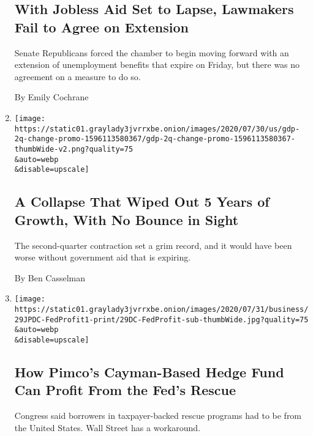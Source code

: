 \begin{enumerate}
{  \subsection{With Jobless Aid Set to Lapse, Lawmakers Fail to Agree on
  Extension}\label{with-jobless-aid-set-to-lapse-lawmakers-fail-to-agree-on-extension}}

  Senate Republicans forced the chamber to begin moving forward with an
  extension of unemployment benefits that expire on Friday, but there
  was no agreement on a measure to do so.

  By Emily Cochrane
\item
  \href{/2020/07/30/business/economy/q2-gdp-coronavirus-economy.html}{}

  \texttt{[image: https://static01.graylady3jvrrxbe.onion/images/2020/07/30/us/gdp-2q-change-promo-1596113580367/gdp-2q-change-promo-1596113580367-thumbWide-v2.png?quality=75\\\&auto=webp\\\&disable=upscale]}

  \hypertarget{a-collapse-that-wiped-out-5-years-of-growth-with-no-bounce-in-sight}{%
  \subsection{A Collapse That Wiped Out 5 Years of Growth, With No
  Bounce in
  Sight}\label{a-collapse-that-wiped-out-5-years-of-growth-with-no-bounce-in-sight}}

  The second-quarter contraction set a grim record, and it would have
  been worse without government aid that is expiring.

  By Ben Casselman
\item
  \href{/2020/07/30/business/economy/fed-talf-wall-street.html}{}

  \texttt{[image: https://static01.graylady3jvrrxbe.onion/images/2020/07/31/business/29JPDC-FedProfit1-print/29DC-FedProfit-sub-thumbWide.jpg?quality=75\\\&auto=webp\\\&disable=upscale]}

  \hypertarget{how-pimcos-cayman-based-hedge-fund-can-profit-from-the-feds-rescue}{%
  \subsection{How Pimco's Cayman-Based Hedge Fund Can Profit From the
  Fed's
  Rescue}\label{how-pimcos-cayman-based-hedge-fund-can-profit-from-the-feds-rescue}}

  Congress said borrowers in taxpayer-backed rescue programs had to be
  from the United States. Wall Street has a workaround.


\end{enumerate}
